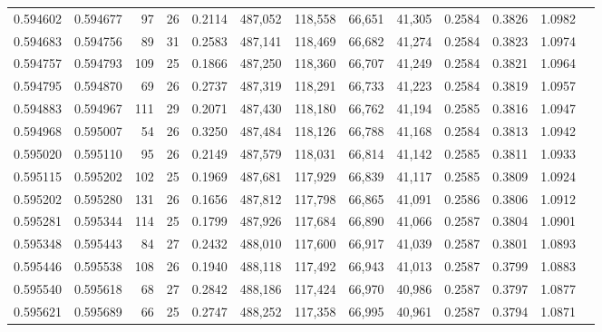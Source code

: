 \begin{tabular}{rrrrrrrrrrrrr}
0.594602 & 0.594677 &  97 &  26 &                                     0.2114 & 487,052 & 118,558 &  66,651 &  41,305 & 0.2584 & 0.3826 & 1.0982 \\
0.594683 & 0.594756 &  89 &  31 &                                     0.2583 & 487,141 & 118,469 &  66,682 &  41,274 & 0.2584 & 0.3823 & 1.0974 \\
0.594757 & 0.594793 & 109 &  25 &                                     0.1866 & 487,250 & 118,360 &  66,707 &  41,249 & 0.2584 & 0.3821 & 1.0964 \\
0.594795 & 0.594870 &  69 &  26 &                                     0.2737 & 487,319 & 118,291 &  66,733 &  41,223 & 0.2584 & 0.3819 & 1.0957 \\
0.594883 & 0.594967 & 111 &  29 &                                     0.2071 & 487,430 & 118,180 &  66,762 &  41,194 & 0.2585 & 0.3816 & 1.0947 \\
0.594968 & 0.595007 &  54 &  26 &                                     0.3250 & 487,484 & 118,126 &  66,788 &  41,168 & 0.2584 & 0.3813 & 1.0942 \\
0.595020 & 0.595110 &  95 &  26 &                                     0.2149 & 487,579 & 118,031 &  66,814 &  41,142 & 0.2585 & 0.3811 & 1.0933 \\
0.595115 & 0.595202 & 102 &  25 &                                     0.1969 & 487,681 & 117,929 &  66,839 &  41,117 & 0.2585 & 0.3809 & 1.0924 \\
0.595202 & 0.595280 & 131 &  26 &                                     0.1656 & 487,812 & 117,798 &  66,865 &  41,091 & 0.2586 & 0.3806 & 1.0912 \\
0.595281 & 0.595344 & 114 &  25 &                                     0.1799 & 487,926 & 117,684 &  66,890 &  41,066 & 0.2587 & 0.3804 & 1.0901 \\
0.595348 & 0.595443 &  84 &  27 &                                     0.2432 & 488,010 & 117,600 &  66,917 &  41,039 & 0.2587 & 0.3801 & 1.0893 \\
0.595446 & 0.595538 & 108 &  26 &                                     0.1940 & 488,118 & 117,492 &  66,943 &  41,013 & 0.2587 & 0.3799 & 1.0883 \\
0.595540 & 0.595618 &  68 &  27 &                                     0.2842 & 488,186 & 117,424 &  66,970 &  40,986 & 0.2587 & 0.3797 & 1.0877 \\
0.595621 & 0.595689 &  66 &  25 &                                     0.2747 & 488,252 & 117,358 &  66,995 &  40,961 & 0.2587 & 0.3794 & 1.0871 \\

\end{tabular}
